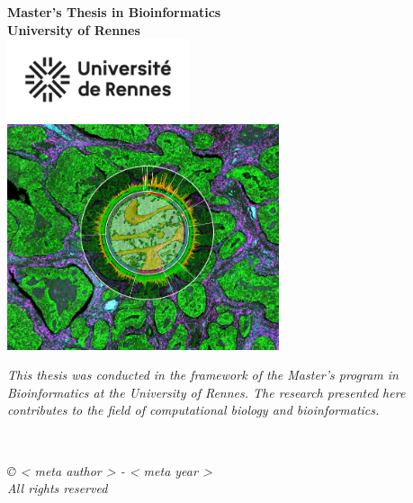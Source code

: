 \newpage  %
\thispagestyle{empty}  %
\begin{center}
  {\Huge \textbf{Master's Thesis in Bioinformatics}} \\[2cm]
  {\Large \textbf{University of Rennes}} \\[1cm]
  \includegraphics[width=0.4\textwidth]{figures/logo_Univ_Rennes.png} \\[1cm]
  \includegraphics[width=0.6\textwidth]{figures/couverture.jpg} \\[1cm]
  \begin{minipage}{0.8\textwidth}
    \centering
    \textit{This thesis was conducted in the framework of the Master's program in Bioinformatics at the University of Rennes. The research presented here contributes to the field of computational biology and bioinformatics.}
  \end{minipage} \\[1cm]
  \begin{minipage}{0.8\textwidth}
    \centering
    \small
    \textit{© {{< meta author >}} - {{< meta year >}} \\ All rights reserved}
  \end{minipage}
\end{center} 